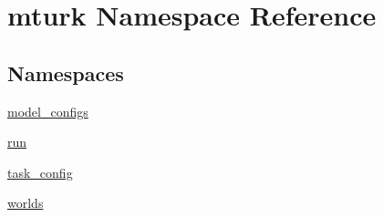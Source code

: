 \hypertarget{namespacemturk}{}\section{mturk Namespace Reference}
\label{namespacemturk}
\subsection*{Namespaces}
\begin{DoxyCompactItemize}
\item 
 \hyperlink{namespacemturk_1_1model__configs}{model\+\_\+configs}
\item 
 \hyperlink{namespacemturk_1_1run}{run}
\item 
 \hyperlink{namespacemturk_1_1task__config}{task\+\_\+config}
\item 
 \hyperlink{namespacemturk_1_1worlds}{worlds}
\end{DoxyCompactItemize}
